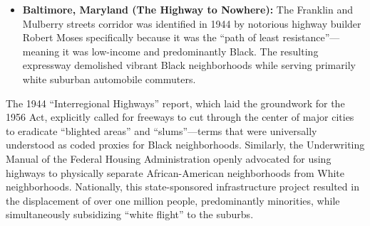 \documentclass[
]{article}
\begin{document}
\begin{itemize}
  enclave of Belle Meade and the Vanderbilt University area. State
  planners quickly abandoned these proposals, recognizing that
  condemning land from prominent white citizens would be both
  exorbitantly expensive and ``political suicide.'' Instead, Nashville
  planners deliberately altered the trajectory of Interstate 40 to
  bisect the city's main Black business district, permanently walling
  off historically Black institutions---such as Fisk University and
  Meharry Medical College---from the communities they had served for
  generations.\\
\item
  \textbf{Baltimore, Maryland (The Highway to Nowhere):} The Franklin
  and Mulberry streets corridor was identified in 1944 by notorious
  highway builder Robert Moses specifically because it was the ``path
  of least resistance''---meaning it was low-income and predominantly
  Black. The resulting expressway demolished vibrant Black neighborhoods
  while serving primarily white suburban automobile commuters.
\end{itemize}

The 1944 ``Interregional Highways'' report, which laid the groundwork
for the 1956 Act, explicitly called for freeways to cut through the
center of major cities to eradicate ``blighted areas'' and
``slums''---terms that were universally understood as coded proxies for
Black neighborhoods. Similarly, the Underwriting Manual of the Federal
Housing Administration openly advocated for using highways to physically
separate African-American neighborhoods from White neighborhoods.
Nationally, this state-sponsored infrastructure project resulted in the
displacement of over one million people, predominantly minorities, while
simultaneously subsidizing ``white flight'' to the suburbs.
\end{document}
